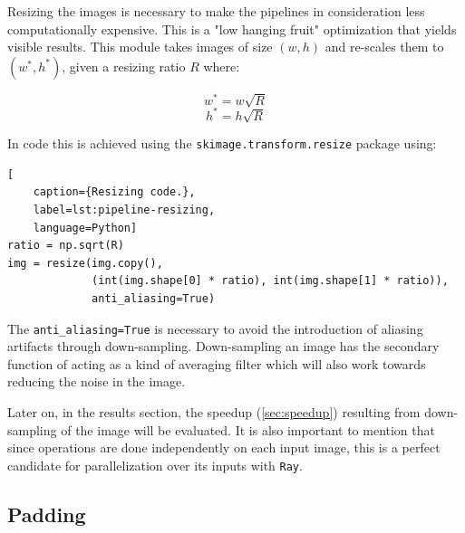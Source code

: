 Resizing the images is necessary to make the pipelines in consideration less computationally expensive. This is a "low hanging fruit" optimization that yields visible results. This module takes images of size \((w, h)\) and re-scales them to \((w^*, h^*)\), given a resizing ratio \(R\) where:

\[w^* = w\sqrt{R}\]
\[h^* = h\sqrt{R}\]

In code this is achieved using the \texttt{skimage.transform.resize} package using:

\begin{lstlisting}[
    caption={Resizing code.},
    label=lst:pipeline-resizing,
    language=Python]
ratio = np.sqrt(R)
img = resize(img.copy(), 
             (int(img.shape[0] * ratio), int(img.shape[1] * ratio)), 
             anti_aliasing=True)
\end{lstlisting}

The \lstinline{anti_aliasing=True} is necessary to avoid the introduction of aliasing artifacts through down-sampling. Down-sampling an image has the secondary function of acting as a kind of averaging filter which will also work towards reducing the noise in the image. 

Later on, in the results section, the speedup (\autoref{sec:speedup}) resulting from down-sampling of the image will be evaluated. It is also important to mention that since operations are done independently on each input image, this is a perfect candidate for parallelization over its inputs with \texttt{Ray}.

\subsection{Padding}

